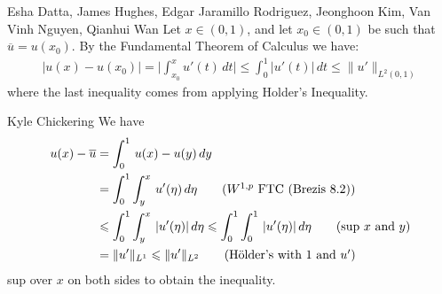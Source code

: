 

\begin{solution}{Esha Datta, James Hughes, Edgar Jaramillo Rodriguez, Jeonghoon Kim, Van Vinh Nguyen, Qianhui Wan}
        Let $x\in (0,1)$, and let $x_0\in (0,1)$ be such that $\overline{u} = u(x_0)$. By the Fundamental Theorem of Calculus we have:
        \begin{equation*}
            \begin{split}
                |u(x)-u(x_0)| = \bigg| \int_{x_0}^x u'(t)\,dt \bigg| \leq \int_0^1 
                |u'(t)|\,dt  \leq \lVert u' \rVert_{L^2(0,1)}
            \end{split}
        \end{equation*}
        where the last inequality comes from applying Holder's Inequality.
\end{solution}

\bigskip

\begin{solution}{Kyle Chickering}
	We have
	\begin{align*}
		u(x) - \overline{u} &= \int_0^1\,u(x)-u(y)\,dy \\
                            &= \int_0^1\int_y^x\,u'(\eta)\,d\eta \tag{$W^{1,p}$ FTC (Brezis 8.2)} \\
                            &\leqslant \int_0^1\int_y^x\,|u'(\eta)|\,d\eta \leqslant \int_0^1\int_0^1\,|u'(\eta)|\,d\eta \tag{sup $x$ and $y$} \\
                            & = \norm{u'}_{L^1} \leqslant \norm{u'}_{L^2} \tag{H\"older's with $1$ and $u'$}
	\end{align*}
	sup over $x$ on both sides to obtain the inequality.
\end{solution}

